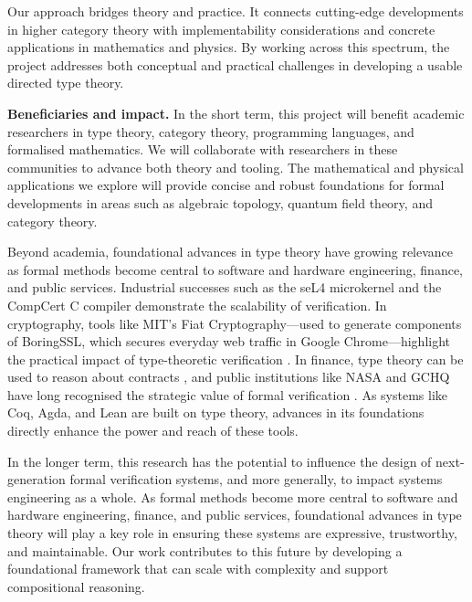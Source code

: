 \documentclass[a4paper,11pt]{article}
\renewcommand{\paragraph}[1]{\textbf{#1.}}
\begin{document}
Our approach bridges theory and practice. It connects cutting-edge
developments in higher category theory with implementability
considerations and concrete applications in mathematics and
physics. By working across this spectrum, the project addresses both
conceptual and practical challenges in developing a usable directed
type theory.

\paragraph{Beneficiaries and impact}
In the short term, this project will benefit academic researchers in
type theory, category theory, programming languages, and formalised
mathematics. We will collaborate with researchers in these communities
to advance both theory and tooling. The mathematical and physical
applications we explore will provide concise and robust foundations
for formal developments in areas such as algebraic topology, quantum
field theory, and category theory.

Beyond academia, foundational advances in type theory have growing relevance as formal methods become central to software and hardware engineering, finance, and public services. Industrial successes such as the seL4 microkernel \cite{klein2014} and the CompCert C compiler \cite{Leroy2009} demonstrate the scalability of verification. In cryptography, tools like MIT’s Fiat Cryptography—used to generate components of BoringSSL, which secures everyday web traffic in Google Chrome—highlight the practical impact of type-theoretic verification \cite{Chlipala2019}. In finance, type theory can be used to reason about contracts \cite{PeytonJones2000}, and public institutions like NASA and GCHQ have long recognised the strategic value of formal verification \cite{Rushby1993}. As systems like Coq, Agda, and Lean are built on type theory, advances in its foundations directly enhance the power and reach of these tools.

In the longer term, this research has the potential to influence the
design of next-generation formal verification systems, and more
generally, to impact systems engineering as a whole. As formal methods
become more central to software and hardware engineering, finance, and
public services, foundational advances in type theory will play a key
role in ensuring these systems are expressive, trustworthy, and
maintainable. Our work contributes to this future by developing a
foundational framework that can scale with complexity and support
compositional reasoning.
\end{document}
